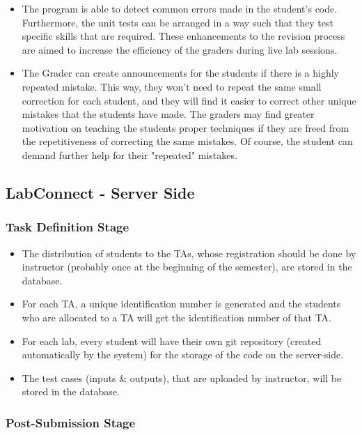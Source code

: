 \documentclass[a4paper, 12pt]{article}
\begin{document}
    \begin{itemize}
      \item The program is able to detect common errors made in the student's code.
      Furthermore, the unit tests can be arranged in a way such that they test specific skills that are
      required. These enhancements to the revision process are aimed to increase the efficiency of the
      graders during live lab sessions.
      \item The Grader can create announcements for the students if there is a highly repeated
      mistake. This way, they won't need to repeat the same small correction for each student,
      and they will find it easier to correct other unique mistakes that the students
      have made. The graders may find greater motivation on teaching the students proper techniques
      if they are freed from the repetitiveness of correcting the same mistakes. Of course, the student can demand
      further help for their "repeated" mistakes.
    \end{itemize}

    \subsection{LabConnect - Server Side}

    \subsubsection{Task Definition Stage}
    \begin{itemize}
      \item The distribution of students to the TAs, whose registration should be done by instructor (probably once at the
      beginning of the semester), are stored in the database.
      \item For each TA, a unique identification number is generated and the students who are allocated to a
      TA will get the identification number of that TA.
      \item For each lab, every student will have their own git repository (created automatically by the system) for the storage of the
      code on the server-side.
      \item The test cases (inputs \& outputs), that are uploaded by instructor, will be stored in the database.
    \end{itemize}

    \subsubsection{Post-Submission Stage}
\end{document}
